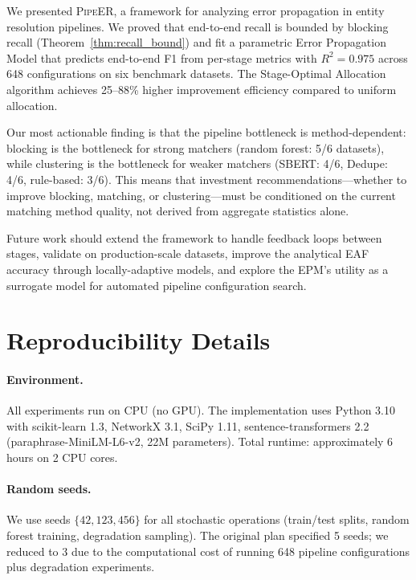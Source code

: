 \documentclass{article}
\newcommand{\PipeER}{\textsc{PipeER}}
\begin{document}
We presented \PipeER{}, a framework for analyzing error propagation in entity resolution pipelines.
We proved that end-to-end recall is bounded by blocking recall (Theorem~\ref{thm:recall_bound}) and fit a parametric Error Propagation Model that predicts end-to-end F1 from per-stage metrics with $R^2 = 0.975$ across 648 configurations on six benchmark datasets.
The Stage-Optimal Allocation algorithm achieves 25--88\% higher improvement efficiency compared to uniform allocation.

Our most actionable finding is that the pipeline bottleneck is method-dependent: blocking is the bottleneck for strong matchers (random forest: 5/6 datasets), while clustering is the bottleneck for weaker matchers (SBERT: 4/6, Dedupe: 4/6, rule-based: 3/6). This means that investment recommendations---whether to improve blocking, matching, or clustering---must be conditioned on the current matching method quality, not derived from aggregate statistics alone.

Future work should extend the framework to handle feedback loops between stages, validate on production-scale datasets, improve the analytical EAF accuracy through locally-adaptive models, and explore the EPM's utility as a surrogate model for automated pipeline configuration search.




\appendix
\section{Reproducibility Details}
\label{app:reproducibility}

\paragraph{Environment.} All experiments run on CPU (no GPU). The implementation uses Python 3.10 with scikit-learn 1.3, NetworkX 3.1, SciPy 1.11, sentence-transformers 2.2 (paraphrase-MiniLM-L6-v2, 22M parameters). Total runtime: approximately 6 hours on 2 CPU cores.

\paragraph{Random seeds.} We use seeds $\{42, 123, 456\}$ for all stochastic operations (train/test splits, random forest training, degradation sampling). The original plan specified 5 seeds; we reduced to 3 due to the computational cost of running 648 pipeline configurations plus degradation experiments.
\end{document}
